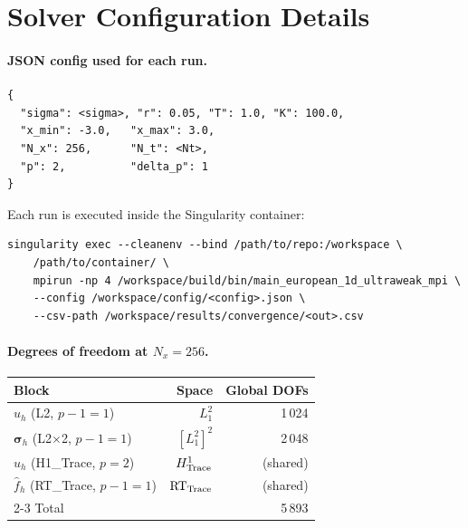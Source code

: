 \documentclass[11pt,a4paper]{article}
\newcommand{\Nx}{N_x}
\begin{document}
\appendix
\section{Solver Configuration Details}

\paragraph{JSON config used for each run.}
\begin{verbatim}
{
  "sigma": <sigma>, "r": 0.05, "T": 1.0, "K": 100.0,
  "x_min": -3.0,   "x_max": 3.0,
  "N_x": 256,      "N_t": <Nt>,
  "p": 2,          "delta_p": 1
}
\end{verbatim}
Each run is executed inside the Singularity container:
\begin{verbatim}
singularity exec --cleanenv --bind /path/to/repo:/workspace \
    /path/to/container/ \
    mpirun -np 4 /workspace/build/bin/main_european_1d_ultraweak_mpi \
    --config /workspace/config/<config>.json \
    --csv-path /workspace/results/convergence/<out>.csv
\end{verbatim}

\paragraph{Degrees of freedom at $\Nx=256$.}
\begin{center}
\begin{tabular}{lrr}
\toprule
Block & Space & Global DOFs \\
\midrule
$u_h$ (L2, $p-1=1$) & $L^2_{1}$ & 1\,024 \\
$\boldsymbol{\sigma}_h$ (L2$\times$2, $p-1=1$) & $[L^2_{1}]^2$ & 2\,048 \\
$\hat{u}_h$ (H1\_Trace, $p=2$) & $H^1_{\rm Trace}$ & (shared) \\
$\hat{f}_h$ (RT\_Trace, $p-1=1$) & $\mathrm{RT}_{\rm Trace}$ & (shared) \\
\cmidrule{2-3}
Total & & 5\,893 \\
\bottomrule
\end{tabular}
\end{center}
\end{document}
